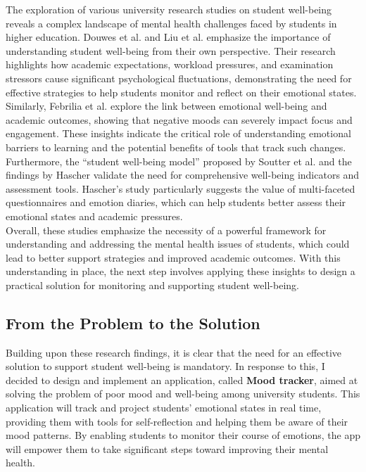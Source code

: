 The exploration of various university research studies on student well-being reveals a complex landscape of mental health challenges faced by students in higher education. Douwes et al. \cite{research-1} and Liu et al. \cite{research-2} emphasize the importance of understanding student well-being from their own perspective. Their research highlights how academic expectations, workload pressures, and examination stressors cause significant psychological fluctuations, demonstrating the need for effective strategies to help students monitor and reflect on their emotional states.\vspace{5mm} \\
Similarly, Febrilia et al. \cite{research-3} explore the link between emotional well-being and academic outcomes, showing that negative moods can severely impact focus and engagement. These insights indicate the critical role of understanding emotional barriers to learning and the potential benefits of tools that track such changes.\vspace{5mm} \\
Furthermore, the “student well-being model” proposed by Soutter et al. \cite{research-4} and the findings by Hascher \cite{research-5} validate the need for comprehensive well-being indicators and assessment tools. Hascher’s study particularly suggests the value of multi-faceted questionnaires and emotion diaries, which can help students better assess their emotional states and academic pressures.\vspace{5mm} \\
Overall, these studies emphasize the necessity of a powerful framework for understanding and addressing the mental health issues of students, which could lead to better support strategies and improved academic outcomes. With this understanding in place, the next step involves applying these insights to design a practical solution for monitoring and supporting student well-being.

\subsection{From the Problem to the Solution}

Building upon these research findings, it is clear that the need for an effective solution to support student well-being is mandatory. In response to this, I decided to design and implement an application, called \textbf{Mood tracker}, aimed at solving the problem of poor mood and well-being among university students. This application will track and project students' emotional states in real time, providing them with tools for self-reflection and helping them be aware of their mood patterns. By enabling students to monitor their course of emotions, the app will empower them to take significant steps toward improving their mental health.

